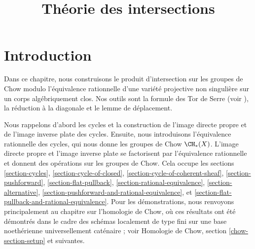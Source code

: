 

%


\title{Théorie des intersections}


\maketitle

\label{section-phantom}

\tableofcontents


\section{Introduction}
\label{section-introduction}

\noindent
Dans ce chapitre, nous construisons le produit d'intersection sur les groupes de Chow
modulo l'équivalence rationnelle d'une variété projective non singulière sur un
corps algébriquement clos. Nos outils sont la formule des Tor de Serre
(voir \cite[chapitre V]{Serre_algebre_locale}), la réduction à la diagonale
et le lemme de déplacement.

\medskip\noindent
Nous rappelons d'abord les cycles et la construction de l'image directe propre et de
l'image inverse plate des cycles. Ensuite, nous introduisons l'équivalence rationnelle des cycles,
qui nous donne les groupes de Chow $\CH_*(X)$. L'image directe propre et l'image inverse plate
se factorisent par l'équivalence rationnelle et donnent des opérations sur les groupes de Chow.
Cela occupe les sections
\ref{section-cycles},
\ref{section-cycle-of-closed},
\ref{section-cycle-of-coherent-sheaf},
\ref{section-pushforward},
\ref{section-flat-pullback},
\ref{section-rational-equivalence},
\ref{section-alternative},
\ref{section-pushforward-and-rational-equivalence}, et
\ref{section-flat-pullback-and-rational-equivalence}.
Pour les démonstrations, nous renvoyons principalement au chapitre sur l'homologie de Chow,
où ces résultats ont été démontrés dans le cadre des
schémas localement de type fini sur une base noethérienne universellement caténaire ; voir
Homologie de Chow, section \ref{chow-section-setup} et suivantes.

